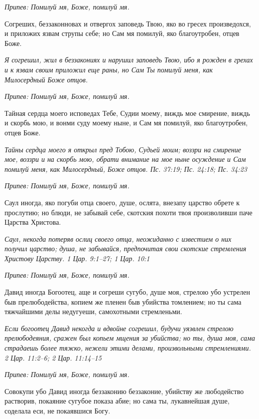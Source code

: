 \itshape Припев:\normalfont{} Помилуй мя, Боже, помилуй мя.


Согреших, беззаконновах и отвергох заповедь Твою, яко во гресех произведохся, и приложих язвам струпы себе; но Сам мя помилуй, яко благоутробен, отцев Боже.


\itshape Я согрешил, жил в беззакониях и нарушил заповедь Твою, ибо я рожден в грехах и к язвам своим приложил еще раны, но Сам Ты помилуй меня, как Милосердный Боже отцов.\normalfont{}


\itshape Припев:\normalfont{} Помилуй мя, Боже, помилуй мя.


Тайная сердца моего исповедах Тебе, Судии моему, виждь мое смирение, виждь и скорбь мою, и вонми суду моему ныне, и Сам мя помилуй, яко благоутробен, отцев Боже.


\itshape Тайны сердца моего я открыл пред Тобою, Судьей моим; воззри на смирение мое, воззри и на скорбь мою, обрати внимание на мое ныне осуждение и Сам помилуй меня, как Милосердный, Боже отцов. Пс. 37:19; Пс. 24:18; Пс. 34:23\normalfont{}


\itshape Припев:\normalfont{} Помилуй мя, Боже, помилуй мя.


Саул иногда, яко погуби отца своего, душе, ослята, внезапу царство обрете к прослутию; но блюди, не забывай себе, скотския похоти твоя произволивши паче Царства Христова.


\itshape Саул, некогда потеряв ослиц своего отца, неожиданно с известием о них получил царство; душа, не забывайся, предпочитая свои скотские стремления Христову Царству. 1 Цар. 9:1–27; 1 Цар. 10:1\normalfont{}


\itshape Припев:\normalfont{} Помилуй мя, Боже, помилуй мя.


Давид иногда Богоотец, аще и согреши сугубо, душе моя, стрелою убо устрелен быв прелюбодейства, копием же пленен быв убийства томлением; но ты сама тяжчайшими делы недугуеши, самохотными стремленьми.


\itshape Если богоотец Давид некогда и вдвойне согрешил, будучи уязвлен стрелою прелюбодеяния, сражен был копьем мщения за убийства; но ты, душа моя, сама страдаешь более тяжко, нежели этими делами, произвольными стремлениями. 2 Цар. 11:2–6; 2 Цар. 11:14–15\normalfont{}


\itshape Припев:\normalfont{} Помилуй мя, Боже, помилуй мя.


Совокупи убо Давид иногда беззаконию беззаконие, убийству же любодейство растворив, покаяние сугубое показа абие; но сама ты, лукавнейшая душе, соделала еси, не покаявшися Богу.


